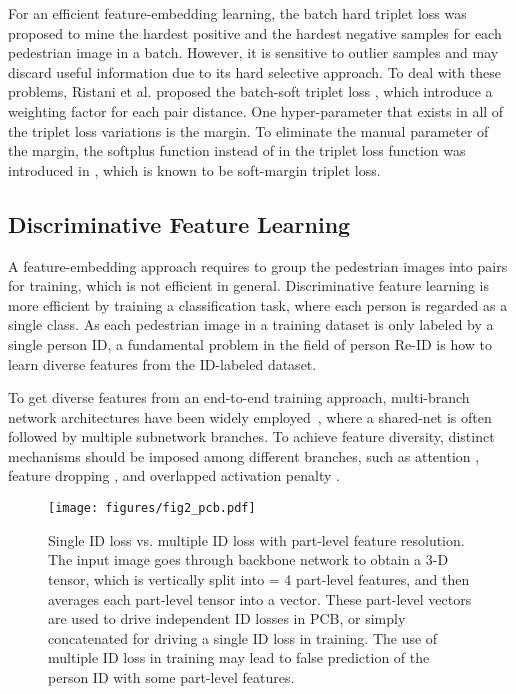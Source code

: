 \documentclass[journal]{IEEEtran}
\begin{document}
For an efficient feature-embedding learning, the batch hard triplet loss \cite{Ristani2018Soft} was proposed to mine the hardest positive and the hardest negative samples for each pedestrian image in a batch. However, it is sensitive to outlier samples and may discard useful information due to its hard selective approach. To deal with these problems, Ristani et al. proposed the batch-soft triplet loss \cite{Ristani2018Soft}, which introduce a weighting factor for each pair distance.  One hyper-parameter that exists in all of the triplet loss variations is the margin. To eliminate the manual parameter of the margin,  the softplus function  instead of  in the triplet loss function was introduced in \cite{hermans2017defense}, which is known to be soft-margin triplet loss.

\subsection{Discriminative Feature Learning}
A feature-embedding approach requires to group the pedestrian images into pairs for training, which is not efficient in general. Discriminative feature learning is more efficient by training a classification task, where each person is regarded as a single class. As each pedestrian image in a training dataset is only labeled by a single person ID, a fundamental problem in the field of person Re-ID is how to learn diverse features from the ID-labeled dataset.

To get diverse features from an end-to-end training approach, multi-branch network architectures have been widely employed~\cite{sun2018beyond,dai2019BDB,chen2017multi}, where a shared-net is often followed by multiple subnetwork branches. To achieve feature diversity, distinct mechanisms should be imposed among different branches, such as attention \cite{chen2019ABD,chen2019MHN}, feature dropping \cite{dai2019BDB,xia2019SONA}, and overlapped activation penalty \cite{yang2019CAMA} .
\begin{figure*}
\begin{center}
\texttt{[image: figures/fig2\_pcb.pdf]} \end{center}
   \caption{Single ID loss vs. multiple ID loss with part-level feature resolution. The input image goes through backbone network to obtain a 3-D tensor, which is vertically split into  = 4 part-level features, and then averages each part-level tensor into a vector. These  part-level vectors are used to drive  independent ID losses in PCB, or simply concatenated for driving a single ID loss in training. The use of multiple ID loss in training may lead to false prediction of the person ID with some part-level features.}
\label{fig:PLR}
\end{figure*}
\end{document}
